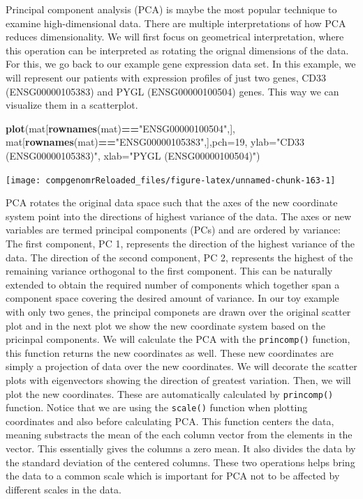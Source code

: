 \documentclass[12pt,]{krantz}
\newenvironment{Shaded}{\begin{snugshade}}{\end{snugshade}}
\newcommand{\DataTypeTok}[1]{\textcolor[rgb]{0.13,0.29,0.53}{#1}}
\newcommand{\DecValTok}[1]{\textcolor[rgb]{0.00,0.00,0.81}{#1}}
\newcommand{\KeywordTok}[1]{\textcolor[rgb]{0.13,0.29,0.53}{\textbf{#1}}}
\newcommand{\NormalTok}[1]{#1}
\newcommand{\OperatorTok}[1]{\textcolor[rgb]{0.81,0.36,0.00}{\textbf{#1}}}
\newcommand{\StringTok}[1]{\textcolor[rgb]{0.31,0.60,0.02}{#1}}
\begin{document}
Principal component analysis (PCA) is maybe the most popular technique to examine high-dimensional data. There are multiple interpretations of how PCA reduces dimensionality. We will first focus on geometrical interpretation, where this operation can be interpreted as rotating the orignal dimensions of the data. For this, we go back to our example gene expression data set. In this example, we will represent our patients with expression profiles of just two genes, CD33 (ENSG00000105383) and PYGL (ENSG00000100504) genes. This way we can visualize them in a scatterplot.

\begin{Shaded}
\begin{Highlighting}[]
\KeywordTok{plot}\NormalTok{(mat[}\KeywordTok{rownames}\NormalTok{(mat)}\OperatorTok{==}\StringTok{"ENSG00000100504"}\NormalTok{,],}
\NormalTok{     mat[}\KeywordTok{rownames}\NormalTok{(mat)}\OperatorTok{==}\StringTok{"ENSG00000105383"}\NormalTok{,],}\DataTypeTok{pch=}\DecValTok{19}\NormalTok{,}
     \DataTypeTok{ylab=}\StringTok{"CD33 (ENSG00000105383)"}\NormalTok{,}
     \DataTypeTok{xlab=}\StringTok{"PYGL (ENSG00000100504)"}\NormalTok{)}
\end{Highlighting}
\end{Shaded}

\begin{center}\texttt{[image: compgenomrReloaded\_files/figure-latex/unnamed-chunk-163-1]} \end{center}

PCA rotates the original data space such that the axes of the new coordinate system point into the directions of highest variance of the data. The axes or new variables are termed principal components (PCs) and are ordered by variance: The first component, PC 1, represents the direction of the highest variance of the data. The direction of the second component, PC 2, represents the highest of the remaining variance orthogonal to the first component. This can be naturally extended to obtain the required number of components which together span a component space covering the desired amount of variance. In our toy example with only two genes, the principal componets are drawn over the original scatter plot and in the next plot we show the new coordinate system based on the pricinpal components. We will calculate the PCA with the \texttt{princomp()} function, this function returns the new coordinates as well. These new coordinates are simply a projection of data over the new coordinates. We will decorate the scatter plots with eigenvectors showing the direction of greatest variation. Then, we will plot the new coordinates. These are automatically calculated by \texttt{princomp()} function. Notice that we are using the \texttt{scale()} function when plotting coordinates and also before calculating PCA. This function centers the data, meaning substracts the mean of the each column vector from the elements in the vector. This essentially gives the columns a zero mean. It also divides the data by the standard deviation of the centered columns. These two operations helps bring the data to a common scale which is important for PCA not to be affected by different scales in the data.
\end{document}
